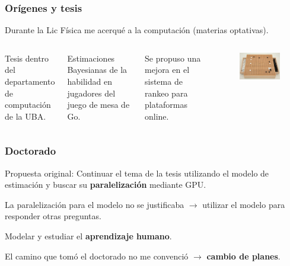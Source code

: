 \documentclass[10pt]{beamer}
\begin{document}
\begin{frame}
\frametitle{Orígenes y tesis}

 Durante la Lic Física me acerqué a la computación (materias optativas).
\begin{columns}
\vspace{0.5cm}
\pause

Tesis dentro del departamento de computación de la UBA.
\vspace{0.5cm}

Estimaciones Bayesianas de la habilidad en jugadores del juego de mesa de Go.

\vspace{0.5cm}
\pause
Se propuso una mejora en el sistema de rankeo para plataformas online.
\begin{figure}[h!]
    \centering
    \includegraphics[scale=2.]{go.jpg}
\end{figure}
\end{columns}
\end{frame}

\begin{frame}
\frametitle{Doctorado}
Propuesta original: Continuar el tema de la tesis utilizando el modelo de estimación y buscar su \textbf{paralelización} mediante GPU.

\pause
La paralelización para el modelo no se justificaba $\rightarrow$ utilizar el modelo para responder otras preguntas.

\pause
Modelar y estudiar el \textbf{aprendizaje humano}.

\pause
El camino que tomó el doctorado  no me convenció $\to$ \textbf{cambio de planes}.



\end{frame}
\end{document}
